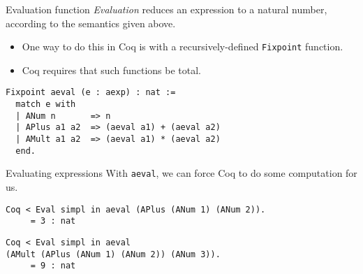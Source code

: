 \begin{frame}[fragile]{Evaluation function}
\emph{Evaluation} reduces an expression to a natural number, according to
the semantics given above.
\begin{itemize}
\item One way to do this in Coq is with a recursively-defined \texttt{Fixpoint}
function.
\item Coq requires that such functions be total.
\end{itemize}

\begin{block}{}
\small\begin{verbatim}
Fixpoint aeval (e : aexp) : nat :=
  match e with
  | ANum n       => n
  | APlus a1 a2  => (aeval a1) + (aeval a2)
  | AMult a1 a2  => (aeval a1) * (aeval a2)
  end.
\end{verbatim}
\end{block}
\end{frame}

\begin{frame}[fragile]{Evaluating expressions}
With \texttt{aeval}, we can force Coq to do some computation for us.

\begin{block}{}
\small\begin{verbatim}
Coq < Eval simpl in aeval (APlus (ANum 1) (ANum 2)).
     = 3 : nat
\end{verbatim}
\end{block}

\begin{block}{}
\small\begin{verbatim}
Coq < Eval simpl in aeval 
(AMult (APlus (ANum 1) (ANum 2)) (ANum 3)).
     = 9 : nat
\end{verbatim}
\end{block}
\end{frame}

